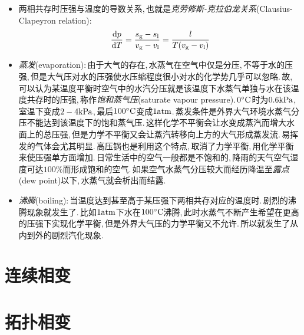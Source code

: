 	\begin{itemize}
	\item 两相共存时压强与温度的导数关系,\,也就是\emph{克劳修斯-克拉伯龙关系}(Clausius-Clapeyron relation):
	\[\frac{\textrm{d} p}{\textrm{d} T}=\frac{s_{\rm g}-s_{\rm l}}{v_{\rm g}-v_{\rm l}}=\frac{l}{T(v_{\rm g}-v_{\rm l})}\]
	
	\item \emph{蒸发}(evaporation):\,由于大气的存在,\,水蒸气在空气中仅是分压,\,不等于水的压强,\,但是大气压对水的压强使水压缩程度很小对水的化学势几乎可以忽略.\,故,\,可以认为某温度平衡时空气中的水汽分压就是该温度下水蒸气单独与水在该温度共存时的压强,\,称作\emph{饱和蒸气压}(saturate vapour pressure).\,$0^\circ \mathrm{C}$时为$0.6{\rm kPa}$,\,室温下变成$2-4{\rm kPa}$,\,最后$100^\circ \mathrm{C}$变成$1{\rm atm}$.\,蒸发条件是外界大气环境水蒸气分压不能达到该温度下的饱和蒸气压.\,这样化学不平衡会让水变成蒸汽而增大水面上的总压强,\,但是力学不平衡又会让蒸汽转移向上方的大气形成蒸发流.\,易挥发的气体会尤其明显.\,高压锅也是利用这个特点,\,取消了力学平衡,\,用化学平衡来使压强单方面增加.\,日常生活中的空气一般都是不饱和的,\,降雨的天气空气湿度可达$100\%$而形成饱和的空气.\,如果空气水蒸气分压较大而经历降温至\emph{露点}(dew point)以下,\,水蒸气就会析出而结露.

	\item \emph{沸腾}(boiling):\,当温度达到甚至高于某压强下两相共存对应的温度时.\,剧烈的沸腾现象就发生了.\,比如$1{\rm atm}$下水在$100^\circ \mathrm{C}$沸腾,\,此时水蒸气不断产生希望在更高的压强下实现化学平衡,\,但是外界大气压的力学平衡又不允许.\,所以就发生了从内到外的剧烈汽化现象.
\end{itemize}

\section{连续相变}

\section{拓扑相变}